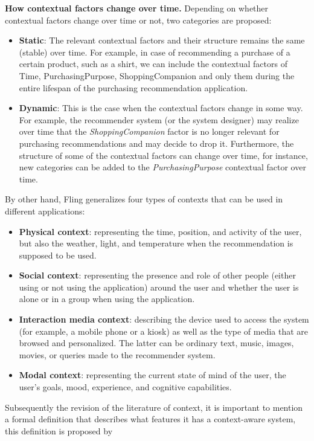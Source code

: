 \textbf{How contextual factors change over time.} Depending on whether 
contextual factors change over time or not, two categories are proposed: 
	\begin{itemize}
	\item \textbf{Static}: The relevant contextual factors and their structure
	remains the same (stable) over time. For example, in case of recommending a
	purchase of a certain product, such as a shirt, we can include the
	contextual factors of Time, PurchasingPurpose, ShoppingCompanion and only
	them during the entire lifespan of the purchasing recommendation
	application.
	\item \textbf {Dynamic}: This is the case when the contextual factors 
	change in some way. For example, the recommender system (or the 
	system designer) may realize over time that the \textit{ShoppingCompanion} 
	factor is no longer relevant for purchasing recommendations and may 
	decide to drop it. Furthermore, the structure of some of the contextual
	factors can change over time, for instance, new categories can be
	added to the \textit{PurchasingPurpose} contextual factor over time.
	\end{itemize}
By other hand, Fling\cite{fling2009mobile} generalizes four types of
contexts that can be used in different applications:  
\begin{itemize}  
\item \textbf{Physical context}: representing the time, position, and
activity of the user, but also the weather, light, and temperature
when the recommendation is supposed to be used.  
\item \textbf{Social context}: representing the presence and role 
of other people (either using or not using the application) around 
the user and whether the user is alone or in a group when using 
the application. 
\item \textbf{Interaction media context}: describing the device used to
access the system (for example, a mobile phone or a kiosk) as well as
the type of media that are browsed and personalized. The latter can be
ordinary text, music, images, movies, or queries made to the
recommender system.  
\item \textbf{Modal context}: representing the current state 
of mind of the user,  the user's goals, mood, experience, 
and cognitive capabilities. 
\end{itemize} 
Subsequently the revision of the literature of context, it is important
to mention a formal definition that describes what features it has a
context-aware system, this definition is proposed by
